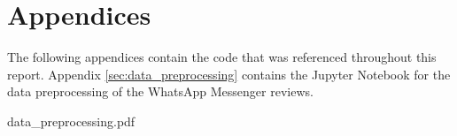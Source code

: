 \documentclass[12pt]{article}
\begin{document}
    \setlength\fboxsep{5pt}
    \setlength{\fboxrule}{1pt}
    \restoregeometry

    \markboth{}{}
    {\hypersetup{linkcolor=black}
        \tableofcontents
        \thispagestyle{fancy}
    }
    \markboth{}{}

    \pagebreak

    

    
    

    \pagebreak

    \part*{Appendices}
        \begin{appendices}
            The following appendices contain the code that was referenced
                throughout this report.
            Appendix \ref{sec:data_preprocessing} contains the Jupyter
                Notebook for the data preprocessing of the WhatsApp Messenger
                reviews.

            
            {data_preprocessing.pdf}
        \end{appendices}
\end{document}
